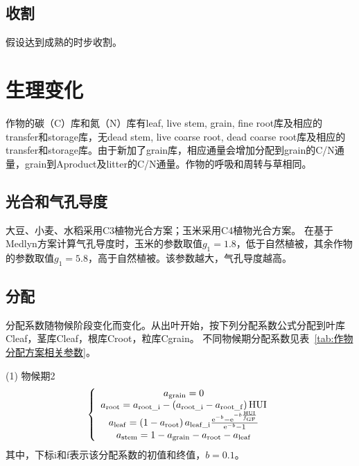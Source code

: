 \subsection{收割}
假设达到成熟的时步收割。


\section{生理变化}
作物的碳（C）库和氮（N）库有leaf, live stem, grain, fine root库及相应的transfer和storage库，无dead stem, live coarse root, dead coarse root库及相应的transfer和storage库。由于新加了grain库，相应通量会增加分配到grain的C/N通量，grain到Aproduct及litter的C/N通量。作物的呼吸和周转与草相同。

\subsection{光合和气孔导度}
大豆、小麦、水稻采用C3植物光合方案；玉米采用C4植物光合方案。
在基于Medlyn方案计算气孔导度时，玉米的参数取值$g_1=1.8$，低于自然植被，其余作物的参数取值$g_1=5.8$，高于自然植被。该参数越大，气孔导度越高。

\subsection{分配}
分配系数随物候阶段变化而变化。从出叶开始，按下列分配系数公式分配到叶库Cleaf，茎库Cleaf，根库Croot，粒库Cgrain。
不同物候期分配系数见表~\ref{tab:作物分配方案相关参数}。

(1)	物候期2 \\
\begin{equation}
  \left\{\begin{array}{c}
      a_{\mathrm{grain}}=0 \\
      a_{\mathrm{root}}=a_{\mathrm{root\_i}}-\left(a_{\mathrm{root\_i}}-a_{\mathrm{root\_f}}\right) {\mathrm {HUI}} \\
      a_{\mathrm{leaf}}=\left(1-a_{\mathrm{root}}\right) a_{\mathrm{leaf\_i}} \frac{{\rm e}^{-{b}}-{\rm e}^{-b \frac{{\mathrm {HUI}}}{f_{\mathrm{GF}}}}}{{\rm e}^{-{b}}-1}   \\
      a_{\mathrm{stem}}=1-a_{\mathrm{grain}}-a_{\mathrm{root}}-a_{\mathrm{leaf}}
  \end{array}\right.
\end{equation}
其中，下标i和f表示该分配系数的初值和终值，$b=0.1$。

